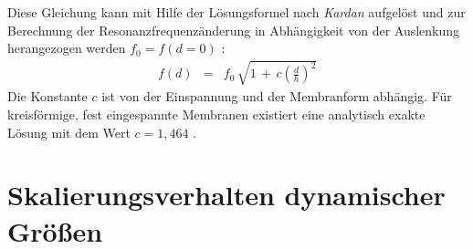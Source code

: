 %
Diese Gleichung kann mit Hilfe der Lösungsformel nach {\sl Kardan} aufgelöst
und zur Berechnung der Resonanzfrequenzänderung in Abhängigkeit von der
Auslenkung herangezogen werden $f_0 = f(d=0)$ \cite{Utt87}:
%
\begin{eqnarray}
\label{fvond}
     f(d) & = & f_{0} \, \sqrt{ 1 \, + \, c \left( \frac{d}{h} \right)^{2}}
\end{eqnarray}
%
Die Konstante $c$ ist von der Einspannung und der Membranform
abhängig. Für kreisförmige, fest eingespannte Membranen existiert eine
analytisch exakte Lösung mit dem Wert $c = 1,464$ \cite{Utt87}.



\section{Skalierungsverhalten dynamischer Größen}
\label{skalierungsverhalten}

